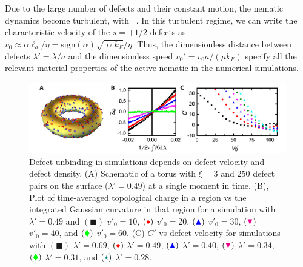 Due to the large number of defects and their constant motion, the nematic dynamics become turbulent, with ~\cite{RN7}.
In this turbulent regime, we can write the characteristic velocity of the $s = +1/2$ defects as $v_0 \approx \alpha \ell_a/ \eta = \textrm{sign}(\alpha) \sqrt{|\alpha| k_F}/\eta$.
Thus, the dimensionless distance between defects $\lambda' = \lambda/a$ and the dimensionless speed $v_0' = v_0 a /(\mu k_F)$ specify all the relevant material properties of the active nematic in the numerical simulations.
\begin{figure}
  \centering
  \includegraphics{figures/C3/Ch3-Figs_SimDefectUnbinding.png}
  \caption{Defect unbinding in simulations depends on defect velocity and defect density.
  (A) Schematic of a torus with $\xi = 3$ and 250 defect pairs on the surface ($\lambda' = 0.49$) at a single moment in time.
  (B), Plot of time-averaged topological charge in a region vs the integrated Gaussian curvature  in that region for a simulation with $\lambda' = 0.49$ and
  $({\blacksquare})$ $v'_0 = 10$,
  $({\color{red} \bullet})$ $v'_0 = 20$,
  $({\color{blue} \blacktriangle})$ $v'_0 = 30$,
  $({\color{magenta} \blacktriangledown})$ $v'_0 = 40$, and
  $({\color{green} \blacklozenge})$ $v'_0 = 60$.
  (C) $C'$ vs defect velocity for simulations with
  $({\blacksquare})$ $\lambda' = 0.69$,
  $({\color{red} \bullet})$ $\lambda' = 0.49$,
  $({\color{blue} \blacktriangle})$ $\lambda' = 0.40$,
  $({\color{magenta} \blacktriangledown})$ $\lambda' = 0.34$,
  $({\color{green} \blacklozenge})$ $\lambda' = 0.31$, and
  $({\color{teal} \star})$ $\lambda' = 0.28$.}\label{f:3-SimDefectUnbinding}
\end{figure}

